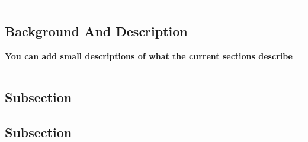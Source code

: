 {\color{gray}\hrule}
\begin{center}
\section{Background And Description}
\textbf{You can add small descriptions of what the current sections describe}
\bigskip
\end{center}
{\color{gray}\hrule}
\begin{multicols}{2}
\subsection{Subsection}
\lipsum[1-3]
\subsection{Subsection}
\lipsum[1-2]
\end{multicols}
